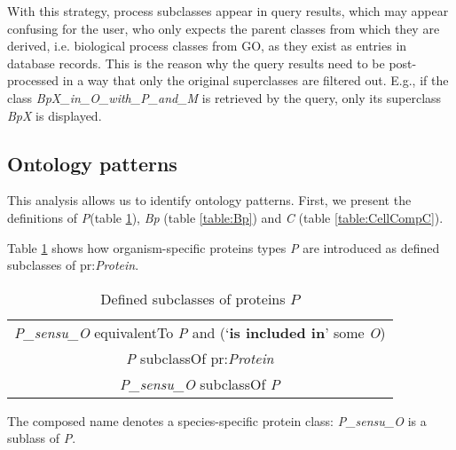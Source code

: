 With this strategy, process subclasses appear in query results, which may appear confusing for the user, who only expects the parent classes from which they are derived, i.e. biological process classes from GO, as they exist as entries in database records. 
%
This is the reason why the query results need to be post-processed in a way that only the original superclasses are filtered out. E.g., 
if the class \textit{BpX\_in\_O\_with\_P\_and\_M} is retrieved by the query, only its superclass \textit{BpX} is displayed. 

\subsection{Ontology patterns}

This analysis allows us to identify ontology patterns. First, we present the definitions of \textit{P}(table \ref{table:ProteinP}), \textit{Bp} (table \ref{table:Bp}) and \textit{C} (table \ref{table:CellCompC}). 

Table \ref{table:ProteinP} shows how organism-specific proteins types \textit{P} are introduced as defined subclasses of pr:\textit{Protein}.

\begin{table}[H]
	\caption{Defined subclasses of proteins $P$}
	\label{table:ProteinP}
	\centering
	\begin{tabular}{c}
		\hline
		\textit{P\_sensu\_O} equivalentTo \textit{P} and (`\textbf{is included in}' some \textit{O}) \\
		\textit{P} subclassOf pr:\textit{Protein} \\ 
		\textit{P\_sensu\_O} subclassOf \textit{P} \\
		\hline
	\end{tabular}
\end{table}%
\noindent
 The composed name denotes a species-specific protein class: \textit{P\_sensu\_O} is a sublass of \textit{P}.

